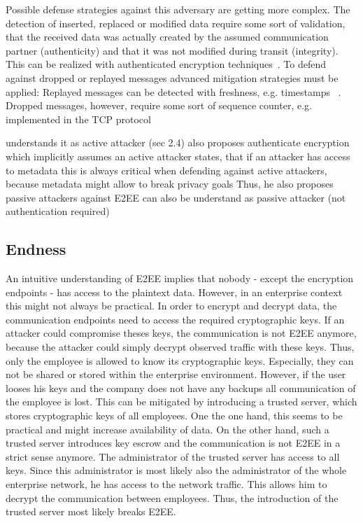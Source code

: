 \documentclass[../main.tex]{subfiles}
\begin{document}
Possible defense strategies against this adversary are getting more complex.
The detection of inserted, replaced or modified data require some sort of validation, that the received data was actually created by the assumed communication partner (authenticity) and that it was not modified during transit (integrity).
This can be realized with authenticated encryption techniques~\cite{Mallory2022}.
To defend against dropped or replayed messages advanced mitigation strategies must be applied:
Replayed messages can be detected with freshness, e.g. timestamps ~\cite[419]{Eckert2018}.
Dropped messages, however, require some sort of sequence counter, e.g. implemented in the TCP protocol ~\cite[115]{Eckert2018}


\cite{Mallory2022} understands it as active attacker (sec 2.4)
\cite{Hale2022} also proposes authenticate encryption which implicitly assumes an active attacker
\cite{Nabeel2017} states, that if an attacker has access to metadata this is always critical when defending against active attackers, because metadata might allow to break privacy goals
Thus, he also proposes passive attackers against E2EE can also be understand as passive attacker (not authentication required)


\subsection{Endness}

An intuitive understanding of E2EE implies that nobody - except the encryption endpoints - has access to the plaintext data.
However, in an enterprise context this might not always be practical.
In order to encrypt and decrypt data, the communication endpoints need to access the required cryptographic keys.
If an attacker could compromise theses keys, the communication is not E2EE anymore, because the attacker could simply decrypt observed traffic with these keys.
Thus, only the employee is allowed to know its cryptographic keys.
Especially, they can not be shared or stored within the enterprise environment.
However, if the user looses his keys and the company does not have any backups all communication of the employee is lost.
This can be mitigated by introducing a trusted server, which stores cryptographic keys of all employees.
One the one hand, this seems to be practical and might increase availability of data. 
On the other hand, such a trusted server introduces key escrow and the communication is not E2EE in a strict sense anymore.
The administrator of the trusted server has access to all keys.
Since this administrator is most likely also the administrator of the whole enterprise network, he has access to the network traffic.
This allows him to decrypt the communication between employees.
Thus, the introduction of the trusted server most likely breaks E2EE.
\end{document}
